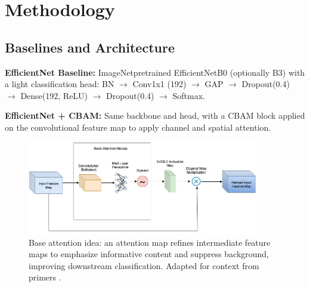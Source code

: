 \chapter{Methodology}
\section{Baselines and Architecture}
\textbf{EfficientNet Baseline:} ImageNet\textendash pretrained EfficientNetB0 (optionally B3) with a light classification head: BN $\rightarrow$ Conv1x1 (192) $\rightarrow$ GAP $\rightarrow$ Dropout(0.4) $\rightarrow$ Dense(192, ReLU) $\rightarrow$ Dropout(0.4) $\rightarrow$ Softmax.

\textbf{EfficientNet + CBAM:} Same backbone and head, with a CBAM block applied on the convolutional feature map to apply channel and spatial attention.

\begin{figure}[t]
  \centering
  \includegraphics[width=0.9\textwidth]{../new_work/figures/about-cbam/base-attention-model.png}
  \caption{Base attention idea: an attention map refines intermediate feature maps to emphasize informative content and suppress background, improving downstream classification. Adapted for context from primers \cite{cbamMedium}.}
  \label{fig:base_attention}
\end{figure}

